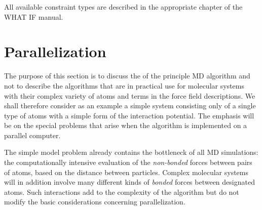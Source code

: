 All available constraint types are described in the appropriate chapter
of the WHAT IF \cite{Whatif} manual.


\section{Parallelization}
\label{sec:par}

\newcommand{\abs}[1]{\mid \! {#1} \! \mid}

The purpose of this section is to discuss the 
 of the 
principle MD algorithm and not to describe the algorithms that are in 
practical use for molecular systems with their complex variety of atoms 
and terms in the force field descriptions. We shall therefore consider 
as an example a simple system consisting only of a single type of atoms 
with a simple form of the interaction potential. The emphasis will be 
on the special problems that arise when the algorithm is implemented on 
a parallel computer. 

The simple model problem already contains the bottleneck of all MD 
simulations: the computationally intensive evaluation of the 
{\em non-bonded} forces between pairs of atoms, based on the distance 
between particles. Complex molecular systems will in addition 
involve many different kinds of {\em bonded} forces between designated 
atoms. Such interactions add to the complexity of the algorithm but do 
not modify the basic considerations concerning parallelization.


